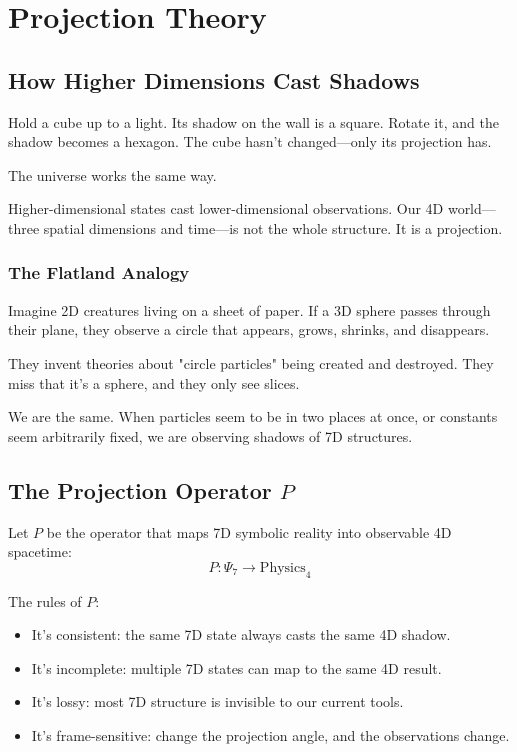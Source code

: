 
\chapter{Projection Theory}

\section{How Higher Dimensions Cast Shadows}

Hold a cube up to a light. Its shadow on the wall is a square. Rotate it, and the shadow becomes a hexagon. The cube hasn’t changed—only its projection has.

The universe works the same way.

Higher-dimensional states cast lower-dimensional observations. Our 4D world—three spatial dimensions and time—is not the whole structure. It is a projection.

\subsection*{The Flatland Analogy}

Imagine 2D creatures living on a sheet of paper. If a 3D sphere passes through their plane, they observe a circle that appears, grows, shrinks, and disappears.

They invent theories about "circle particles" being created and destroyed. They miss that it's a sphere, and they only see slices.

We are the same. When particles seem to be in two places at once, or constants seem arbitrarily fixed, we are observing shadows of 7D structures.

\section{The Projection Operator $P$}

Let $P$ be the operator that maps 7D symbolic reality into observable 4D spacetime:
\[
P: \Psi_7 \rightarrow \text{Physics}_4
\]

The rules of $P$:
\begin{itemize}
\item It’s consistent: the same 7D state always casts the same 4D shadow.
\item It’s incomplete: multiple 7D states can map to the same 4D result.
\item It’s lossy: most 7D structure is invisible to our current tools.
\item It’s frame-sensitive: change the projection angle, and the observations change.
\end{itemize}

